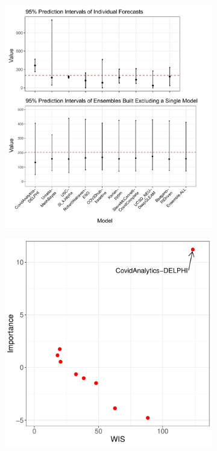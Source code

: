 \documentclass{article}
\theoremstyle{definition}
\begin{document}
\begin{figure}
\centering
\begin{subfigure}{\textwidth}
	\subcaption{}
	\includegraphics[scale=0.55]{95PIs.pdf}
		\label{fig:PIs2021}
\end{subfigure}\par
\begin{subfigure}{\textwidth}
	\subcaption{}
\includegraphics{manuscript-fig3-2.wis_imp20211225}


\end{subfigure}
\end{figure}
\end{document}
